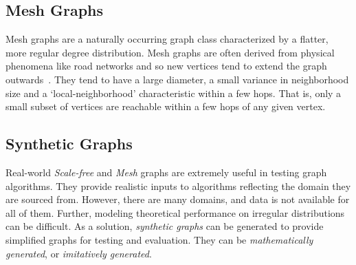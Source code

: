 \subsection{Mesh Graphs}
Mesh graphs are a naturally occurring graph class characterized by a  flatter, more regular degree distribution.
Mesh graphs are often derived from physical phenomena like road networks and so new vertices tend to extend the graph outwards~\cite{Beamer2015}.
They tend to have a large diameter, a small variance in neighborhood size and a `local-neighborhood' characteristic  within a few hops.
That is, only a small subset of vertices are reachable within a few hops of any given vertex.



\subsection{Synthetic Graphs}

Real-world \textit{Scale-free} and \textit{Mesh} graphs are extremely useful in testing graph algorithms. 
They provide realistic inputs to algorithms reflecting the domain they are sourced from. 
However, there are many domains, and data is not available for all of them. 
Further, modeling theoretical performance on irregular distributions can be difficult. 
As a solution, \textit{synthetic graphs} can be generated to provide simplified graphs for testing and evaluation. 
They can be \textit{mathematically generated}, or \textit{imitatively generated}.

